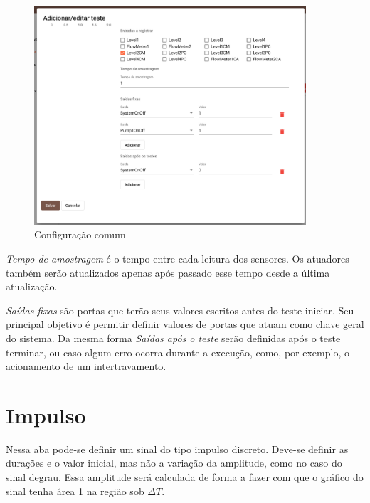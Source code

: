 \begin{figure}[ht!]
    \centering
    \includegraphics[width=0.9\textwidth]{imgs/system-response3}
    \caption[Configuração comum]{Configuração comum}%
    \label{fig:system-response3}
\end{figure}

\textit{Tempo de amostragem} é o tempo entre cada leitura dos sensores. Os
atuadores também serão atualizados apenas após passado esse tempo desde a
última atualização.

\textit{Saídas fixas} são portas que terão seus valores escritos antes do teste
iniciar. Seu principal objetivo é permitir definir valores de portas que atuam
como chave geral do sistema. Da mesma forma \textit{Saídas após o teste} serão
definidas após o teste terminar, ou caso algum erro ocorra durante a execução,
como, por exemplo, o acionamento de um intertravamento.

\newpage{}
\section{Impulso}%
\label{sec:impulse}

Nessa aba pode-se definir um sinal do tipo impulso discreto. Deve-se definir as
durações e o valor inicial, mas não a variação da amplitude, como no caso do
sinal degrau. Essa amplitude será calculada de forma a fazer com que o gráfico
do sinal tenha área 1 na região sob \(\Delta{}T\).

